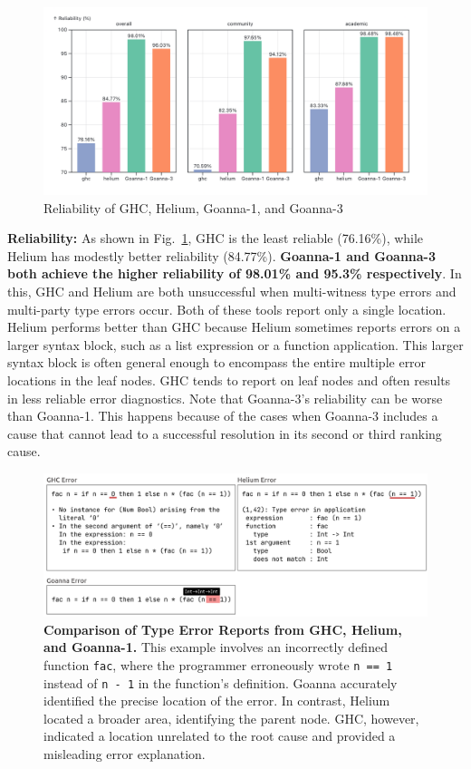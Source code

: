 \documentclass[pdflatex,lineno,sn-nature,Numbered]{sn-jnl}%
\begin{document}
    \begin{figure}
        \centering
        \includegraphics[width=\linewidth]{images/Reliability.png}
        \caption{Reliability of GHC, Helium, Goanna-1, and Goanna-3}
        \label{fig:reliability}
    \end{figure}

\textbf{Reliability:} As shown in Fig.~\ref{fig:reliability}, GHC is the least reliable (76.16\%), while Helium has modestly better reliability (84.77\%). {\bf Goanna-1 and Goanna-3 both achieve the higher reliability of 98.01\% and 95.3\% respectively}. In this, GHC and Helium are both unsuccessful when multi-witness type errors and multi-party type errors occur. Both of these tools report only a single location. Helium performs better than GHC because Helium sometimes reports errors on a larger syntax block, such as a list expression or a function application. This larger syntax block is often general enough to encompass the entire multiple error locations in the leaf nodes. GHC tends to report on leaf nodes and often results in less reliable error diagnostics. Note that Goanna-3's reliability can be worse than Goanna-1. This happens because of the cases when Goanna-3 includes a cause that cannot lead to a successful resolution in its second or third ranking cause. 
    \begin{figure}
        \centering
        \includegraphics[width=\linewidth]{images/ErrorCompare}
\caption{{\bf Comparison of Type Error Reports from GHC, Helium, and Goanna-1.} This example involves an incorrectly defined function {\tt fac}, where the programmer erroneously wrote {\tt n == 1} instead of {\tt n - 1} in the function's definition. Goanna accurately identified the precise location of the error. In contrast, Helium located a broader area, identifying the parent node. GHC, however, indicated a location unrelated to the root cause and provided a misleading error explanation.}
        \label{fig:error-compare}
    \end{figure}
\end{document}
